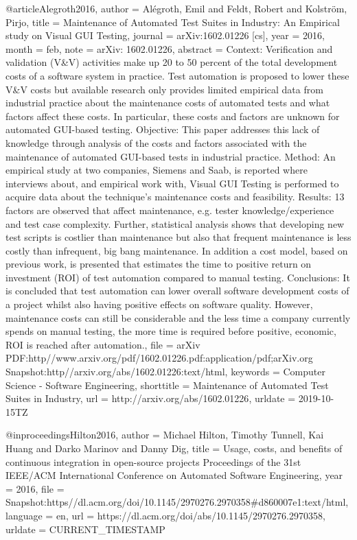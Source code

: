 {{@article{Alegroth2016,
  author     = {Alégroth, Emil and Feldt, Robert and Kolström, Pirjo},
  title      = {Maintenance of {Automated} {Test} {Suites} in {Industry}: {An} {Empirical} study on {Visual} {GUI} {Testing}},
  journal    = {arXiv:1602.01226 [cs]},
  year       = {2016},
  month      = feb,
  note       = {arXiv: 1602.01226},
  abstract   = {Context: Verification and validation (V\&V) activities make up 20 to 50 percent of the total development costs of a software system in practice. Test automation is proposed to lower these V\&V costs but available research only provides limited empirical data from industrial practice about the maintenance costs of automated tests and what factors affect these costs. In particular, these costs and factors are unknown for automated GUI-based testing. Objective: This paper addresses this lack of knowledge through analysis of the costs and factors associated with the maintenance of automated GUI-based tests in industrial practice. Method: An empirical study at two companies, Siemens and Saab, is reported where interviews about, and empirical work with, Visual GUI Testing is performed to acquire data about the technique's maintenance costs and feasibility. Results: 13 factors are observed that affect maintenance, e.g. tester knowledge/experience and test case complexity. Further, statistical analysis shows that developing new test scripts is costlier than maintenance but also that frequent maintenance is less costly than infrequent, big bang maintenance. In addition a cost model, based on previous work, is presented that estimates the time to positive return on investment (ROI) of test automation compared to manual testing. Conclusions: It is concluded that test automation can lower overall software development costs of a project whilst also having positive effects on software quality. However, maintenance costs can still be considerable and the less time a company currently spends on manual testing, the more time is required before positive, economic, ROI is reached after automation.},
  file       = {arXiv PDF:http\://www.arxiv.org/pdf/1602.01226.pdf:application/pdf;arXiv.org Snapshot:http\://arxiv.org/abs/1602.01226:text/html},
  keywords   = {Computer Science - Software Engineering},
  shorttitle = {Maintenance of {Automated} {Test} {Suites} in {Industry}},
  url        = {http://arxiv.org/abs/1602.01226},
  urldate    = {2019-10-15TZ}
}

@inproceedings{Hilton2016,
  author   = {Michael Hilton, Timothy Tunnell, Kai Huang and Darko Marinov and Danny Dig},
  title    = {Usage, costs, and benefits of continuous integration in open-source projects {\textbar} {Proceedings} of the 31st {IEEE}/{ACM} {International} {Conference} on {Automated} {Software} {Engineering}},
  year     = {2016},
  file     = {Snapshot:https\://dl.acm.org/doi/10.1145/2970276.2970358#d860007e1:text/html},
  language = {en},
  url      = {https://dl.acm.org/doi/abs/10.1145/2970276.2970358},
  urldate  = {CURRENT\_TIMESTAMP}
}

}}
